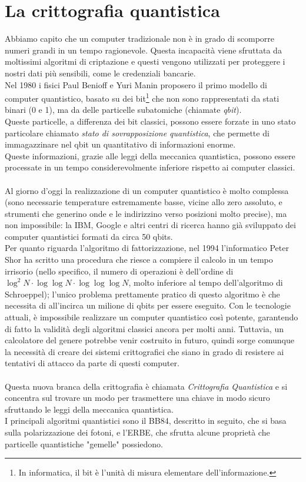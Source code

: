 \documentclass[italian,A4,12pt]{article}
\begin{document}
  \section{La crittografia quantistica}
    Abbiamo capito che un computer tradizionale non è in grado di scomporre numeri grandi in un tempo ragionevole. Questa incapacità viene sfruttata da moltissimi algoritmi di criptazione e questi vengono utilizzati per proteggere i nostri dati più sensibili, come le credenziali bancarie.\\
    Nel 1980 i fisici Paul Benioff e Yuri Manin proposero il primo modello di computer quantistico, basato su dei bit\footnote{In informatica, il bit è l'unità di misura elementare dell'informazione.} che non sono rappresentati da stati binari (0 e 1), ma da delle particelle subatomiche (chiamate \textit{qbit}).\\
    Queste particelle, a differenza dei bit classici, possono essere forzate in uno stato particolare chiamato \textit{stato di sovrapposizione quantistica}, che permette di immagazzinare nel qbit un quantitativo di informazioni enorme.\\
    Queste informazioni, grazie alle leggi della meccanica quantistica, possono essere processate in un tempo considerevolmente inferiore rispetto ai computer classici.\\\\
    Al giorno d'oggi la realizzazione di un computer quantistico è molto complessa (sono necessarie temperature estremamente basse, vicine allo zero assoluto, e strumenti che generino onde e le indirizzino verso posizioni molto precise), ma non impossibile: la IBM, Google e altri centri di ricerca hanno già sviluppato dei computer quantistici formati da circa 50 qbits.\\
    Per quanto riguarda l'algoritmo di fattorizzazione, nel 1994 l'informatico Peter Shor ha scritto una procedura che riesce a compiere il calcolo in un tempo irrisorio (nello specifico, il numero di operazioni è dell'ordine di $\log^2{N}\cdot\log{\log{N}}\cdot\log{\log{\log{N}}}$, molto inferiore al tempo dell'algoritmo di Schroeppel); l'unico problema prettamente pratico di questo algoritmo è che necessita di all'incirca un milione di qbits per essere eseguito.
    Con le tecnologie attuali, è impossibile realizzare un computer quantistico così potente, garantendo di fatto la validità degli algoritmi classici ancora per molti anni. Tuttavia, un calcolatore del genere potrebbe venir costruito in futuro, quindi sorge comunque la necessità di creare dei sistemi crittografici che siano in grado di resistere ai tentativi di attacco da parte di questi computer.\\\\
    \newpage
    Questa nuova branca della crittografia è chiamata \textit{Crittografia Quantistica} e si concentra sul trovare un modo per trasmettere una chiave in modo sicuro sfruttando le leggi della meccanica quantistica.\\
    I principali algoritmi quantistici sono il BB84, descritto in seguito, che si basa sulla polarizzazione dei fotoni, e l'ERBE, che sfrutta alcune proprietà che particelle quantistiche "gemelle" possiedono.
\end{document}
